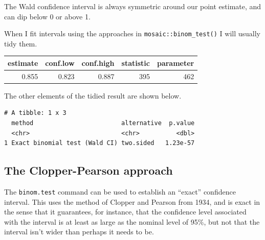 \documentclass[
]{book}
\newenvironment{Shaded}{\begin{snugshade}}{\end{snugshade}}
\newcommand{\DataTypeTok}[1]{\textcolor[rgb]{0.13,0.29,0.53}{#1}}
\newcommand{\DecValTok}[1]{\textcolor[rgb]{0.00,0.00,0.81}{#1}}
\newcommand{\KeywordTok}[1]{\textcolor[rgb]{0.13,0.29,0.53}{\textbf{#1}}}
\newcommand{\NormalTok}[1]{#1}
\newcommand{\OperatorTok}[1]{\textcolor[rgb]{0.81,0.36,0.00}{\textbf{#1}}}
\newcommand{\StringTok}[1]{\textcolor[rgb]{0.31,0.60,0.02}{#1}}
\begin{document}
The Wald confidence interval is always symmetric around our point estimate, and can dip below 0 or above 1.

When I fit intervals using the approaches in \texttt{mosaic::binom\_test()} I will usually tidy them.

\begin{Shaded}
\end{Shaded}

\begin{tabular}{r|r|r|r|r}
\hline
estimate & conf.low & conf.high & statistic & parameter\\
\hline
0.855 & 0.823 & 0.887 & 395 & 462\\
\hline
\end{tabular}

The other elements of the tidied result are shown below.

\begin{Shaded}
\end{Shaded}

\begin{verbatim}
# A tibble: 1 x 3
  method                        alternative  p.value
  <chr>                         <chr>          <dbl>
1 Exact binomial test (Wald CI) two.sided   1.23e-57
\end{verbatim}

\hypertarget{the-clopper-pearson-approach}{%
\subsection{The Clopper-Pearson approach}\label{the-clopper-pearson-approach}}

The \texttt{binom.test} command can be used to establish an ``exact'' confidence interval. This uses the method of Clopper and Pearson from 1934, and is exact in the sense that it guarantees, for instance, that the confidence level associated with the interval is at least as large as the nominal level of 95\%, but not that the interval isn't wider than perhaps it needs to be.
\end{document}
